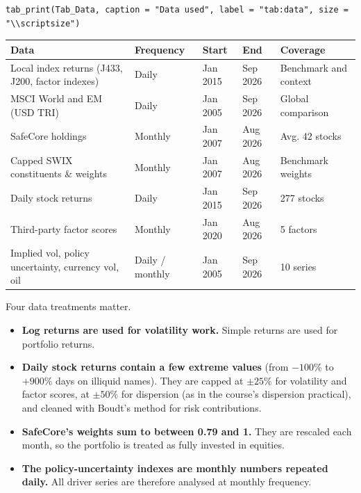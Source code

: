 \documentclass[11pt,preprint]{elsarticle}
\let\origtable\table
\let\endorigtable\endtable
\renewenvironment{table}[1][2] {
    \expandafter\origtable\expandafter[H]
} {
    \endorigtable
}
\numberwithin{equation}{section}
\numberwithin{figure}{section}
\numberwithin{table}{section}
\def\tightlist{} %
\begin{document}
\begin{verbatim}
tab_print(Tab_Data, caption = "Data used", label = "tab:data", size = "\\scriptsize")
\end{verbatim}

\begin{table}[!htbp]
\centering
\caption{Data used} 
\label{tab:data}
\begingroup\scriptsize
\begin{tabular}{lllll}
  \hline
Data & Frequency & Start & End & Coverage \\ 
  \hline
Local index returns (J433, J200, factor indexes) & Daily & Jan 2015 & Sep 2026 & Benchmark and context \\ 
  MSCI World and EM (USD TRI) & Daily & Jan 2005 & Sep 2026 & Global comparison \\ 
  SafeCore holdings & Monthly & Jan 2007 & Aug 2026 & Avg. 42 stocks \\ 
  Capped SWIX constituents \& weights & Monthly & Jan 2007 & Aug 2026 & Benchmark weights \\ 
  Daily stock returns & Daily & Jan 2015 & Sep 2026 & 277 stocks \\ 
  Third-party factor scores & Monthly & Jan 2020 & Aug 2026 & 5 factors \\ 
  Implied vol, policy uncertainty, currency vol, oil & Daily / monthly & Jan 2005 & Sep 2026 & 10 series \\ 
   \hline
\end{tabular}
\endgroup
\end{table}

Four data treatments matter.

\begin{itemize}
\tightlist
\item
  \textbf{Log returns are used for volatility work.} Simple returns are
  used for portfolio returns.
\item
  \textbf{Daily stock returns contain a few extreme values} (from
  \(-100\%\) to \(+900\%\) days on illiquid names). They are capped at
  \(\pm 25\%\) for volatility and factor scores, at \(\pm 50\%\) for
  dispersion (as in the course's dispersion practical), and cleaned with
  Boudt's method for risk contributions.
\item
  \textbf{SafeCore's weights sum to between 0.79 and 1.} They are
  rescaled each month, so the portfolio is treated as fully invested in
  equities.
\item
  \textbf{The policy-uncertainty indexes are monthly numbers repeated
  daily.} All driver series are therefore analysed at monthly frequency.
\end{itemize}
\end{document}
